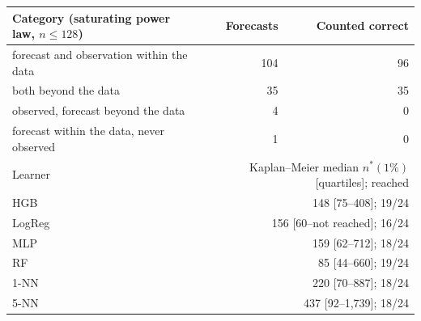 \begin{tabular}{lrr}
\toprule
Category (saturating power law, $n\le128$) & Forecasts & Counted correct \\
\midrule
forecast and observation within the data & 104 & 96 \\
both beyond the data & 35 & 35 \\
observed, forecast beyond the data & 4 & 0 \\
forecast within the data, never observed & 1 & 0 \\
\midrule
Learner & \multicolumn{2}{r}{Kaplan--Meier median $n^*(1\%)$ [quartiles]; reached} \\
\midrule
HGB & \multicolumn{2}{r}{148 [75--408]; 19/24} \\
LogReg & \multicolumn{2}{r}{156 [60--not reached]; 16/24} \\
MLP & \multicolumn{2}{r}{159 [62--712]; 18/24} \\
RF & \multicolumn{2}{r}{85 [44--660]; 19/24} \\
1-NN & \multicolumn{2}{r}{220 [70--887]; 18/24} \\
5-NN & \multicolumn{2}{r}{437 [92--1,739]; 18/24} \\
\bottomrule
\end{tabular}
